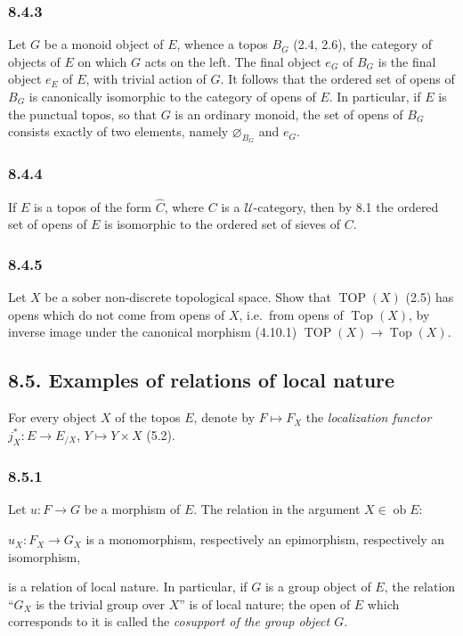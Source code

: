 \documentclass[11pt]{article}
\newcommand{\U}{\mathcal{U}}
\newcommand{\Top}{\operatorname{Top}}
\newcommand{\TOP}{\operatorname{TOP}}
\newcommand{\ob}{\operatorname{ob}}
\newcommand{\ie}{i.e.}
\begin{document}
\subsubsection*{8.4.3}
Let \(G\) be a monoid object of \(E\), whence a topos \(B_G\) (2.4, 2.6), the category of objects of \(E\) on which \(G\) acts on the left. The final object \(e_G\) of \(B_G\) is the final object \(e_E\) of \(E\), with trivial action of \(G\). It follows that the ordered set of opens of \(B_G\) is canonically isomorphic to the category of opens of \(E\). In particular, if \(E\) is the punctual topos, so that \(G\) is an ordinary monoid, the set of opens of \(B_G\) consists exactly of two elements, namely \(\varnothing_{B_G}\) and \(e_G\).

\subsubsection*{8.4.4}
If \(E\) is a topos of the form \(\widehat C\), where \(C\) is a \(\U\)-category, then by 8.1 the ordered set of opens of \(E\) is isomorphic to the ordered set of sieves of \(C\).

\subsubsection*{8.4.5}
Let \(X\) be a sober non-discrete topological space. Show that \(\TOP(X)\) (2.5) has opens which do not come from opens of \(X\), \ie\ from opens of \(\Top(X)\), by inverse image under the canonical morphism (4.10.1) \(\TOP(X)\to\Top(X)\).

\subsection*{8.5. Examples of relations of local nature}

For every object \(X\) of the topos \(E\), denote by \(F\mapsto F_X\) the \emph{localization functor} \(j_X^*:E\to E_{/X}\), \(Y\mapsto Y\times X\) (5.2).

\subsubsection*{8.5.1}
Let \(u:F\to G\) be a morphism of \(E\). The relation in the argument \(X\in\ob E\):
\begin{center}
\(u_X:F_X\to G_X\) is a monomorphism, respectively an epimorphism, respectively an isomorphism,
\end{center}
is a relation of local nature. In particular, if \(G\) is a group object of \(E\), the relation ``\(G_X\) is the trivial group over \(X\)'' is of local nature; the open of \(E\) which corresponds to it is called the \emph{cosupport of the group object \(G\)}.
\end{document}
